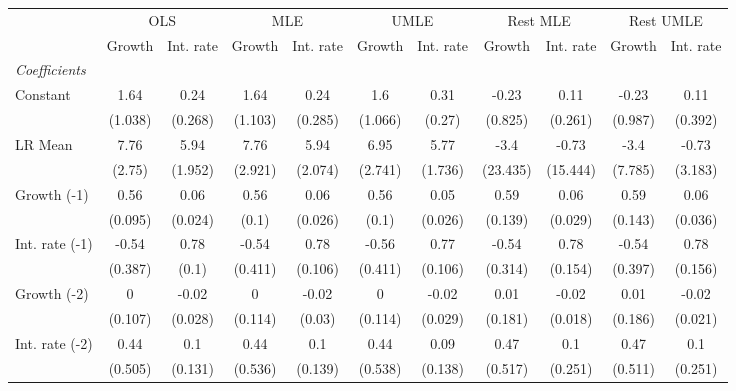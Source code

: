 \begin{table}[htbp] 
	\centering
	\begin{tabular}{@{\extracolsep{4pt}}lcccccccccc@{}}		\hline\hline
		 		 & \multicolumn{2}{c}{OLS} &\multicolumn{2}{c}{MLE} &\multicolumn{2}{c}{UMLE} &\multicolumn{2}{c}{Rest MLE} &\multicolumn{2}{c}{Rest UMLE} \\ 
 		 & Growth 	 & Int. rate 	 & Growth 	 & Int. rate 	 & Growth 	 & Int. rate 	 & Growth 	 & Int. rate 	 & Growth 	 & Int. rate\\\cline{2-3}\cline{4-5}\cline{6-7}\cline{8-9}\cline{10-11}
\rule{0pt}{4ex} 
 \emph{Coefficients} 	  		 & 		 & 		 & 		 & 		 & 		 & 		 & 		 & 		 & 		 &\\ 
\quad Constant 	 & 1.64 	 & 0.24 	 & 1.64 	 & 0.24 	 & 1.6 	 & 0.31 	 & -0.23 	 & 0.11 	 & -0.23 	 & 0.11	 \\ 
 		 & (1.038) 	 & (0.268) 	 & (1.103) 	 & (0.285) 	 & (1.066) 	 & (0.27) 	 & (0.825) 	 & (0.261) 	 & (0.987) 	 & (0.392) 	 \\ 
\quad LR Mean 	 & 7.76 	 & 5.94 	 & 7.76 	 & 5.94 	 & 6.95 	 & 5.77 	 & -3.4 	 & -0.73 	 & -3.4 	 & -0.73	 \\ 
 		 & (2.75) 	 & (1.952) 	 & (2.921) 	 & (2.074) 	 & (2.741) 	 & (1.736) 	 & (23.435) 	 & (15.444) 	 & (7.785) 	 & (3.183) 	 \\ 
\quad Growth (-1) 	 &0.56 	 & 0.06 	 & 0.56 	 & 0.06 	 & 0.56 	 & 0.05 	 & 0.59 	 & 0.06 	 & 0.59 	 & 0.06	 \\ 
 		 & (0.095) 	 & (0.024) 	 & (0.1) 	 & (0.026) 	 & (0.1) 	 & (0.026) 	 & (0.139) 	 & (0.029) 	 & (0.143) 	 & (0.036) 	 \\ 
\quad Int. rate (-1) 	 &-0.54 	 & 0.78 	 & -0.54 	 & 0.78 	 & -0.56 	 & 0.77 	 & -0.54 	 & 0.78 	 & -0.54 	 & 0.78	 \\ 
 		 & (0.387) 	 & (0.1) 	 & (0.411) 	 & (0.106) 	 & (0.411) 	 & (0.106) 	 & (0.314) 	 & (0.154) 	 & (0.397) 	 & (0.156) 	 \\ 
\quad Growth (-2) 	 &0 	 & -0.02 	 & 0 	 & -0.02 	 & 0 	 & -0.02 	 & 0.01 	 & -0.02 	 & 0.01 	 & -0.02	 \\ 
 		 & (0.107) 	 & (0.028) 	 & (0.114) 	 & (0.03) 	 & (0.114) 	 & (0.029) 	 & (0.181) 	 & (0.018) 	 & (0.186) 	 & (0.021) 	 \\ 
\quad Int. rate (-2) 	 &0.44 	 & 0.1 	 & 0.44 	 & 0.1 	 & 0.44 	 & 0.09 	 & 0.47 	 & 0.1 	 & 0.47 	 & 0.1	 \\ 
 		 & (0.505) 	 & (0.131) 	 & (0.536) 	 & (0.139) 	 & (0.538) 	 & (0.138) 	 & (0.517) 	 & (0.251) 	 & (0.511) 	 & (0.251) 	 \\ 

\end{tabular}
\end{table}
